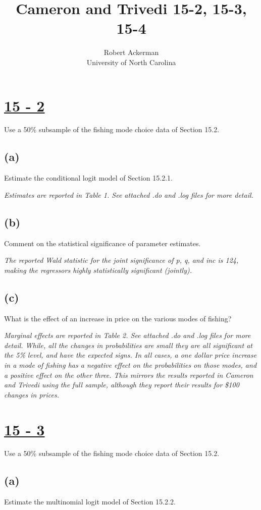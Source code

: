 \documentclass[11pt]{article}
\title{Cameron and Trivedi 15-2, 15-3, 15-4}
\author{Robert Ackerman \\ University of North Carolina}
\theoremstyle{definition}
\begin{document}
\maketitle
{}

\section*{\underline{15 - 2}} 
Use a 50\% subsample of the fishing mode choice data of Section 15.2.

\subsection*{(a)}
Estimate the conditional logit model of Section 15.2.1.

\textit{Estimates are reported in Table 1. See attached .do and .log files for more detail.}

\subsection*{(b)}
Comment on the statistical significance of parameter estimates.

\textit{The reported Wald statistic for the joint significance of p, q, and inc is 124, making the regressors highly statistically significant (jointly).}

\subsection*{(c)}
What is the effect of an increase in price on the various modes of fishing?

\textit{Marginal effects are reported in Table 2. See attached .do and .log files for more detail. While, all the changes in probabilities are small they are all significant at the 5\% level, and have the expected signs.  In all cases, a one dollar price increase in a mode of fishing has a negative effect on the probabilities on those modes, and a positive effect on the other three.  This mirrors the results reported in Cameron and Trivedi using the full sample, although they report their results for \$100 changes in prices.}

\section*{\underline{15 - 3}} 
Use a 50\% subsample of the fishing mode choice data of Section 15.2.
 
\subsection*{(a)}
Estimate the multinomial logit model of Section 15.2.2.
\end{document}
